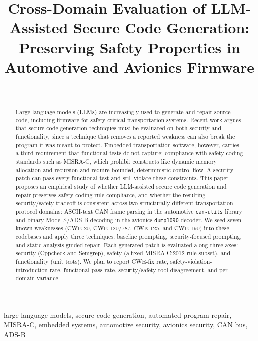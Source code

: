 \documentclass[12pt]{IEEEtran}
\begin{document}
\title{Cross-Domain Evaluation of LLM-Assisted Secure Code Generation: Preserving Safety Properties in Automotive and Avionics Firmware}

\author{
\\
%
}
\maketitle

\begin{abstract}
Large language models (LLMs) are increasingly used to generate and repair source code, including firmware for safety-critical transportation systems. Recent work argues that secure code generation techniques must be evaluated on both security and functionality, since a technique that removes a reported weakness can also break the program it was meant to protect. Embedded transportation software, however, carries a third requirement that functional tests do not capture: compliance with safety coding standards such as MISRA-C, which prohibit constructs like dynamic memory allocation and recursion and require bounded, deterministic control flow. A security patch can pass every functional test and still violate these constraints. This paper proposes an empirical study of whether LLM-assisted secure code generation and repair preserves safety-coding-rule compliance, and whether the resulting security/safety tradeoff is consistent across two structurally different transportation protocol domains: ASCII-text CAN frame parsing in the automotive \texttt{can-utils} library and binary Mode~S/ADS-B decoding in the avionics \texttt{dump1090} decoder. We seed seven known weaknesses (CWE-20, CWE-120/787, CWE-125, and CWE-190) into these codebases and apply three techniques: baseline prompting, security-focused prompting, and static-analysis-guided repair. Each generated patch is evaluated along three axes: security (Cppcheck and Semgrep), safety (a fixed MISRA-C:2012 rule subset), and functionality (unit tests). We plan to report CWE-fix rate, safety-violation-introduction rate, functional pass rate, security/safety tool disagreement, and per-domain variance.
\end{abstract}

\begin{IEEEkeywords}
large language models, secure code generation, automated program repair, MISRA-C, embedded systems, automotive security, avionics security, CAN bus, ADS-B
\end{IEEEkeywords}
\end{document}
